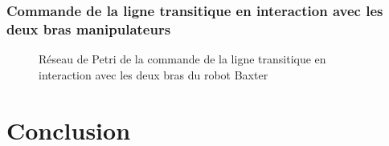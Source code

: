 \documentclass[a4paper,french, titlepage]{article}
\begin{document}
\subsubsection{Commande de la ligne transitique en interaction avec les deux bras manipulateurs}


\begin{figure}[H] 
\begin{center}
\end{center}
\caption{Réseau de Petri de la commande de la ligne transitique en interaction avec les deux bras du robot Baxter}
\label{main_commande_baxter_2_bras_ligne_transitique}
\end{figure}


\newpage
{}
\section*{Conclusion}
\end{document}
